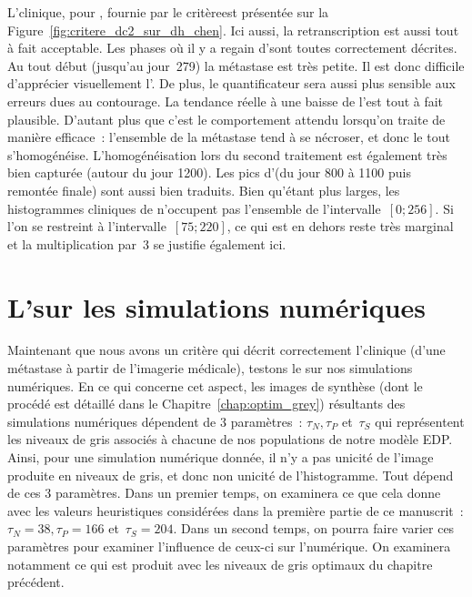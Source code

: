 \documentclass[main.tex]{subfiles}
\begin{document}
L'\hetero clinique, pour \Chen, fournie par le critère\HH est présentée sur la Figure~\ref{fig:critere_dc2_sur_dh_chen}. Ici aussi, la retranscription est aussi tout à fait acceptable. Les phases où il y a regain d'\hetero sont toutes correctement décrites. Au tout début (jusqu'au jour~279) la métastase est très petite. Il est donc difficile d'apprécier visuellement l'\hetero. De plus, le quantificateur sera aussi plus sensible aux erreurs dues au contourage. La tendance réelle à une baisse de l'\hetero est tout à fait plausible. D'autant plus que c'est le comportement attendu lorsqu'on traite de manière efficace~: l'ensemble de la métastase tend à se nécroser, et donc le tout s'homogénéise. 
L'homogénéisation lors du second traitement est également très bien capturée (autour du jour 1200). 
Les pics d'\hetero (du jour 800 à 1100 puis remontée finale) sont aussi bien traduits. 
Bien qu'étant plus larges, les histogrammes cliniques de \Chen n'occupent pas l'ensemble de l'intervalle~$[0;256]$. Si l'on se restreint à l'intervalle~$[75;220]$, ce qui est en dehors reste très marginal et la multiplication par~3 se justifie également ici. 


\section{L'\hetero sur les simulations numériques}

Maintenant que nous avons un critère qui décrit correctement l'\hetero clinique (d'une métastase à partir de l'imagerie médicale), testons le %
sur nos simulations numériques. 
En ce qui concerne cet aspect, les images de synthèse (dont le procédé est détaillé dans le Chapitre~\ref{chap:optim_grey}) résultants des simulations numériques dépendent de 3 paramètres~: $\tau_N, \tau_P$ et~$\tau_S$ qui représentent les niveaux de gris associés à chacune de nos populations de notre modèle EDP. Ainsi, pour une simulation numérique donnée, il n'y a pas unicité de l'image produite en niveaux de gris, et donc non unicité de l'histogramme. Tout dépend de ces 3 paramètres. Dans un premier temps,  on examinera ce que cela donne avec les valeurs heuristiques considérées  dans la première partie de ce manuscrit~: $\tau_N=38, \tau_P=166$ et~$\tau_S=204$. 
Dans un second temps, on pourra faire varier ces paramètres pour examiner l'influence de ceux-ci sur l'\hetero numérique. On examinera notamment ce qui est produit avec les niveaux de gris optimaux du chapitre précédent. 
\end{document}

